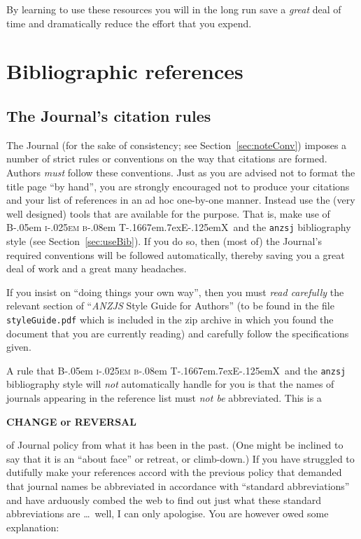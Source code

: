 \documentclass[times, doublespace]{anzsauth}
\newcommand\BibTeX{{\rmfamily B\kern-.05em \textsc{i\kern-.025em b}\kern-.08em
T\kern-.1667em\lower.7ex\hbox{E}\kern-.125emX}}
\begin{document}
By learning to use these resources you will in the long
run save a \emph{great} deal of time and dramatically reduce the
effort that you expend.

\section{Bibliographic references}
\label{sec:bibRef}

\subsection{The Journal's citation rules}
\label{sec:citeRules}

The Journal (for the sake of consistency; see
Section~\ref{sec:noteConv}) imposes a number of strict rules
or conventions on the way that citations are formed.  Authors
\emph{must} follow these conventions.  Just as you are advised not
to format the title page ``by hand'', you are strongly encouraged not
to produce your citations and your list of references in an ad hoc
one-by-one manner.  Instead use the (very well designed) tools that
are available for the purpose.  That is, make use of \BibTeX\ and
the \texttt{anzsj} bibliography style (see Section~\ref{sec:useBib}).
If you do so, then (most of) the Journal's required conventions will
be followed automatically, thereby saving you a great deal of work
and a great many headaches.

If you insist on ``doing things your own way'',
then you must \emph{read carefully} the relevant section of
``\textit{ANZJS} Style Guide for Authors'' (to be found in the
file \texttt{styleGuide.pdf} which is included in the zip archive
in which you found the document that you are currently reading)
and carefully follow the specifications given.

A rule that \BibTeX\ and the \texttt{anzsj} bibliography style will
\emph{not} automatically handle for you is that the names of journals
appearing in the reference list must \emph{not be} abbreviated.
This is a
\begin{center}
{\large \textbf{CHANGE or REVERSAL}}
\end{center}
of Journal policy from what it has been in the past. (One might
be inclined to say that it is an ``about face'' or retreat, or
climb-down.)  If you have struggled to dutifully make your references
accord with the previous policy that demanded that journal names
be abbreviated in accordance with ``standard abbreviations'' and
have arduously combed the web to find out just what these standard
abbreviations are \ldots\ well, I can only apologise.  You are however
owed some explanation:
\end{document}
